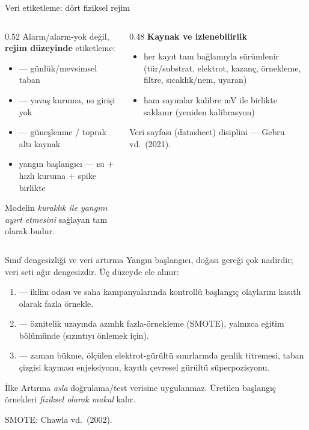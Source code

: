 \documentclass[aspectratio=169,11pt]{beamer}
\newcommand{\src}[1]{{\scriptsize\color{aegisLeaf}#1}}
\begin{document}
\begin{frame}{Veri etiketleme: dört fiziksel rejim}
  \begin{columns}[T]
    \begin{column}{0.52\textwidth}
      Alarm/alarm-yok değil, \textbf{rejim düzeyinde} etiketleme:
      \begin{itemize}
        \item {} — günlük/mevsimsel taban
        \item {} — yavaş kuruma, ısı girişi yok
        \item {} — güneşlenme / toprak altı kaynak
        \item \alert{yangın başlangıcı} — ısı $+$ hızlı kuruma $+$ spike birlikte
      \end{itemize}
      Modelin \emph{kuraklık ile yangını ayırt etmesini} sağlayan tam olarak budur.
    \end{column}
    \begin{column}{0.48\textwidth}
      \textbf{Kaynak ve izlenebilirlik}
      \begin{itemize}\small
        \item her kayıt tam bağlamıyla sürümlenir (tür/substrat, elektrot, kazanç,
          örnekleme, filtre, sıcaklık/nem, uyaran)
        \item ham sayımlar kalibre mV ile birlikte saklanır (yeniden kalibrasyon)
      \end{itemize}
      \src{Veri sayfası (datasheet) disiplini — Gebru vd.\ (2021).}
    \end{column}
  \end{columns}
\end{frame}

\begin{frame}{Sınıf dengesizliği ve veri artırma}
  Yangın başlangıcı, doğası gereği çok nadirdir; veri seti ağır dengesizdir. Üç
  düzeyde ele alınır:
  \begin{enumerate}
    \item {} — iklim odası ve saha kampanyalarında kontrollü
      başlangıç olaylarını kasıtlı olarak fazla örnekle.
    \item {} — öznitelik uzayında azınlık fazla-örnekleme
      (SMOTE), \alert{yalnızca eğitim bölümünde} (sızıntıyı önlemek için).
    \item {} — zaman bükme, ölçülen elektrot-gürültü
      sınırlarında genlik titremesi, taban çizgisi kayması enjeksiyonu, kayıtlı
      çevresel gürültü süperpozisyonu.
  \end{enumerate}
  \begin{block}{İlke}
    Artırma \emph{asla} doğrulama/test verisine uygulanmaz. Üretilen başlangıç
    örnekleri \emph{fiziksel olarak makul} kalır.
  \end{block}
  \src{SMOTE: Chawla vd.\ (2002).}
\end{frame}
\end{document}
